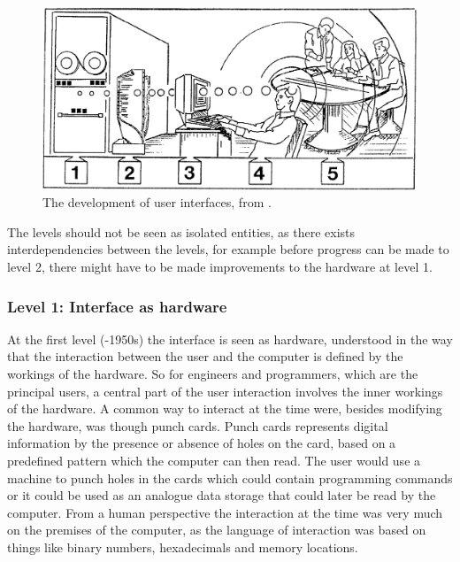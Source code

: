 \begin{figure}[h]
	\centering
  		\includegraphics[width=0.9\linewidth]{figures/foci-interface}
	\caption[The development of user interfaces \citep{grudin1990computer}.]
   {The development of user interfaces, from \citep{grudin1990computer}.}
   \label{foci-interface}
\end{figure}
The levels should not be seen as isolated entities, as there exists interdependencies between the levels, for example before progress can be made to level 2, there might have to be made improvements to the hardware at level 1.

\subsubsection{Level 1: Interface as hardware}
At the first level (-1950s) the interface is seen as hardware, understood in the way that the interaction between the user and the computer is defined by the workings of the hardware.
So for engineers and programmers, which are the principal users, a central part of the user interaction involves the inner workings of the hardware.
A common way to interact at the time were, besides modifying the hardware, was though punch cards.
Punch cards represents digital information by the presence or absence of holes on the card, based on a predefined pattern which the computer can then read.
The user would use a machine to punch holes in the cards which could contain programming commands or it could be used as an analogue data storage that could later be read by the computer.
From a human perspective the interaction at the time was very much on the premises of the computer, as the language of interaction was based on things like binary numbers, hexadecimals and memory locations.

